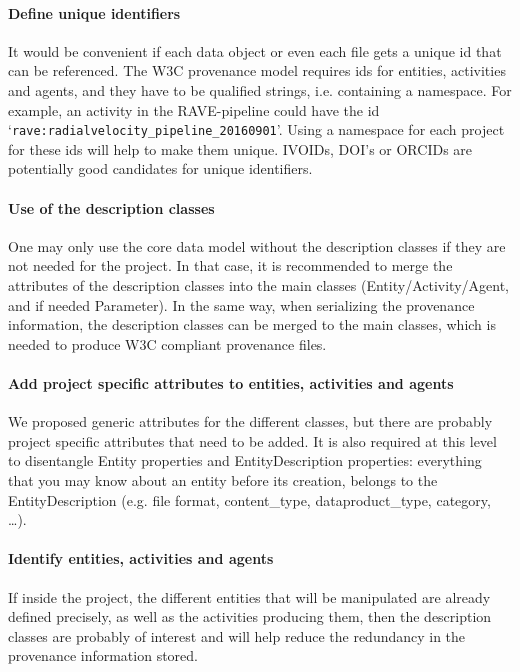 \paragraph{Define unique identifiers}
It would be convenient if each data object or even each file 
gets a unique id that can be referenced. The W3C provenance model requires ids
for entities, activities and agents, and they have to be qualified strings, 
i.e. containing a namespace. For example, an activity in the RAVE-pipeline could 
have the id `\texttt{rave:radialvelocity\_pipeline\_20160901}'. 
Using a namespace for each 
project for these ids will help to make them unique. 
IVOIDs, DOI's or ORCIDs are potentially good candidates for unique identifiers.

\paragraph{Use of the description classes} 
One may only use the core data model without the description classes if they are not needed for the project. In that case, it is recommended to merge the attributes of the description classes into the main classes (Entity/Activity/Agent, and if needed Parameter). In the same way, when serializing the provenance information, the description classes can be merged to the main classes, which is needed to produce W3C compliant provenance files.

\paragraph{Add project specific attributes to entities, activities and agents}
We proposed generic attributes for the different classes, but there are probably project specific attributes that need to be added. 
It is also required at this level to disentangle Entity properties and EntityDescription properties: everything that you may know about an entity before its creation, belongs to the EntityDescription (e.g. file format, content\_type, dataproduct\_type, category, \dots).

\paragraph{Identify entities, activities and agents}
If inside the project, the different entities that will be manipulated are already defined precisely, as well as the activities producing them, then the description classes are probably of interest and will help reduce the redundancy in the provenance information stored. 


